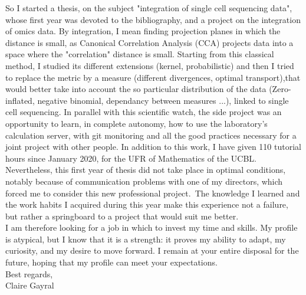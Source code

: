 \documentclass[a4paper,11pt]{article}
\begin{document}
So I started a thesis, on the subject "integration of single cell sequencing data", whose first year was devoted to the bibliography, and a project on the integration of omics data. 
%
By integration, I mean finding projection planes in which the distance is small, as Canonical Correlation Analysis (CCA) projects data into a space where the "correlation" distance is small. Starting from this classical method, I studied its different extensions (kernel, probabilistic) and then I tried to replace the metric by a measure (different divergences, optimal transport),that would better take into account the so particular distribution of the data (Zero-inflated, negative binomial, dependancy between measures ...), linked to single cell sequencing. 
In parallel with this scientific watch, the side project was an opportunity to learn, in complete autonomy, how to use the laboratory's calculation server, with git monitoring and all the good practices necessary for a joint project with other people.
In addition to this work, I have given 110 tutorial hours since January 2020, for the UFR of Mathematics of the UCBL. 
Nevertheless, this first year of thesis did not take place in optimal conditions, notably because of communication problems with one of my directors, which forced me to consider this new professional project.\ 
The knowledge I learned and the work habits I acquired during this year make this experience not a failure, but rather a springboard to a project that would suit me better. \\

I am therefore looking for a job in which to invest my time and skills. My profile is atypical, but I know that it is a strength: it proves my ability to adapt, my curiosity, and my desire to move forward. 
I remain at your entire disposal for the future, hoping that my profile can meet your expectations. \\

Best regards,\\

Claire Gayral
\end{document}

